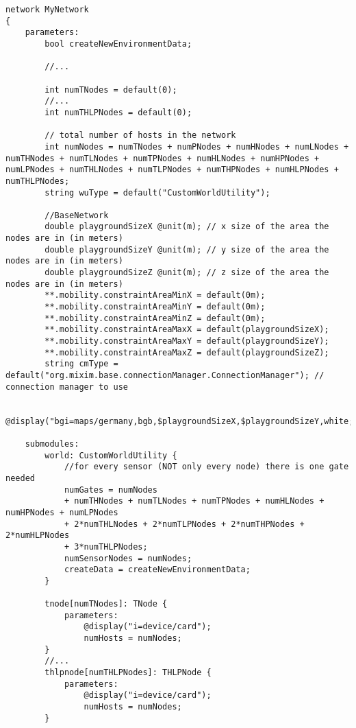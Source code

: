 \begin{lstlisting}[language=ned,caption={Network},label=lst:Network]
network MyNetwork
{
    parameters:
        bool createNewEnvironmentData;

        //...

        int numTNodes = default(0);
        //...
        int numTHLPNodes = default(0);

        // total number of hosts in the network
        int numNodes = numTNodes + numPNodes + numHNodes + numLNodes + numTHNodes + numTLNodes + numTPNodes + numHLNodes + numHPNodes + numLPNodes + numTHLNodes + numTLPNodes + numTHPNodes + numHLPNodes + numTHLPNodes;
        string wuType = default("CustomWorldUtility");

        //BaseNetwork
        double playgroundSizeX @unit(m); // x size of the area the nodes are in (in meters)
        double playgroundSizeY @unit(m); // y size of the area the nodes are in (in meters)
        double playgroundSizeZ @unit(m); // z size of the area the nodes are in (in meters)
        **.mobility.constraintAreaMinX = default(0m);
        **.mobility.constraintAreaMinY = default(0m);
        **.mobility.constraintAreaMinZ = default(0m);
        **.mobility.constraintAreaMaxX = default(playgroundSizeX);
        **.mobility.constraintAreaMaxY = default(playgroundSizeY);
        **.mobility.constraintAreaMaxZ = default(playgroundSizeZ);
        string cmType = default("org.mixim.base.connectionManager.ConnectionManager"); // connection manager to use

        @display("bgi=maps/germany,bgb,$playgroundSizeX,$playgroundSizeY,white;bgp=0,0;bgb=$playgroundSizeX,$playgroundSizeY");

    submodules:
        world: CustomWorldUtility {
            //for every sensor (NOT only every node) there is one gate needed
            numGates = numNodes 
            + numTHNodes + numTLNodes + numTPNodes + numHLNodes + numHPNodes + numLPNodes 
            + 2*numTHLNodes + 2*numTLPNodes + 2*numTHPNodes + 2*numHLPNodes 
            + 3*numTHLPNodes;
            numSensorNodes = numNodes;
            createData = createNewEnvironmentData;
        }
        
        tnode[numTNodes]: TNode {
            parameters:
                @display("i=device/card");
                numHosts = numNodes;
        }
        //...
        thlpnode[numTHLPNodes]: THLPNode {
            parameters:
                @display("i=device/card");
                numHosts = numNodes;
        }


\end{lstlisting}
